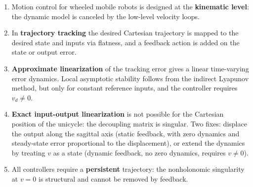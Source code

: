 \begin{enumerate}
    \item Motion control for wheeled mobile robots is designed at the
          \textbf{kinematic level}: the dynamic model is canceled by
          the low-level velocity loops.
    \item In \textbf{trajectory tracking} the desired Cartesian
          trajectory is mapped to the desired state and inputs via
          flatness, and a feedback action is added on the state or
          output error.
    \item \textbf{Approximate linearization} of the tracking error
          gives a linear time-varying error dynamics. Local asymptotic
          stability follows from the indirect Lyapunov method, but
          only for constant reference inputs, and the controller
          requires \( v_d \neq 0 \).
    \item \textbf{Exact input-output linearization} is not possible
          for the Cartesian position of the unicycle: the decoupling
          matrix is singular. Two fixes: displace the output along
          the sagittal axis (static feedback, with zero dynamics and
          steady-state error proportional to the displacement), or
          extend the dynamics by treating \( v \) as a state (dynamic
          feedback, no zero dynamics, requires \( v \neq 0 \)).
    \item All controllers require a \textbf{persistent} trajectory:
          the nonholonomic singularity at \( v = 0 \) is structural
          and cannot be removed by feedback.
\end{enumerate}